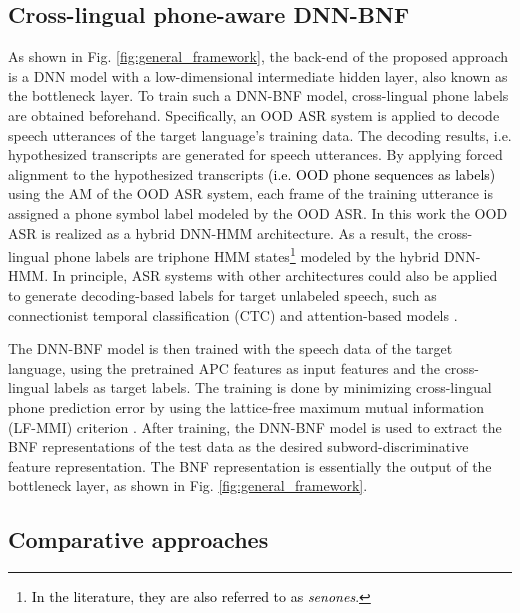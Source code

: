 \documentclass[transmag]{IEEEtran}
\begin{document}
\subsection{Cross-lingual phone-aware DNN-BNF}
\label{subsec:approach_crs_ling_bnf}
As shown in Fig. \ref{fig:general_framework}, the back-end of the proposed approach is a DNN model with a low-dimensional intermediate hidden layer, also known as the bottleneck layer. To train such a DNN-BNF model, cross-lingual phone labels are obtained beforehand. Specifically, an OOD ASR system is applied to decode speech utterances of the target language’s training data. 
The decoding results, i.e. hypothesized transcripts are generated for speech utterances. 
By applying forced alignment to the hypothesized transcripts \textcolor{black}{(i.e. OOD phone sequences as labels)} using the AM of the OOD ASR system, each frame of the training utterance is assigned a phone symbol label modeled by the OOD ASR.
In this work the OOD ASR is realized as a hybrid DNN-HMM architecture. 
As a result, the cross-lingual phone labels are triphone HMM states\footnote{\textcolor{black}{In the literature, they are also   referred to as \textit{senones}}.} modeled by the hybrid DNN-HMM. In principle, ASR systems with other architectures could also be applied to generate decoding-based labels for target unlabeled speech, such as connectionist temporal classification (CTC)  \cite{graves2014towards} and attention-based models \cite{chan2016listen}.

The DNN-BNF model is then trained with the speech data of the target language, using the pretrained APC features as input features and the cross-lingual labels as target labels. The training is done by minimizing cross-lingual phone prediction error by using the lattice-free maximum mutual information (LF-MMI) criterion \cite{povey2016purely}. 
After training, the DNN-BNF model is used to extract the BNF representations of the test data as the desired subword-discriminative feature representation. The BNF representation is essentially the output of the bottleneck layer, as shown in Fig. \ref{fig:general_framework}.

\subsection{Comparative approaches}
\label{subsec:approach_comparative_approaches}
\end{document}
